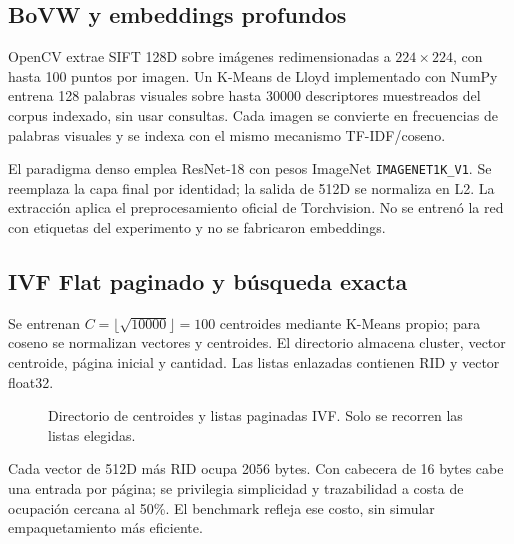 \documentclass[11pt,a4paper]{article}
\newcommand{\code}[1]{\texttt{#1}}
\begin{document}
\subsection{BoVW y embeddings profundos}
OpenCV extrae SIFT 128D sobre imágenes redimensionadas a $224\times224$, con hasta 100 puntos por imagen. Un K-Means de Lloyd implementado con NumPy entrena 128 palabras visuales sobre hasta 30000 descriptores muestreados del corpus indexado, sin usar consultas. Cada imagen se convierte en frecuencias de palabras visuales y se indexa con el mismo mecanismo TF-IDF/coseno.

El paradigma denso emplea ResNet-18 con pesos ImageNet \code{IMAGENET1K\_V1}. Se reemplaza la capa final por identidad; la salida de 512D se normaliza en L2. La extracción aplica el preprocesamiento oficial de Torchvision. No se entrenó la red con etiquetas del experimento y no se fabricaron embeddings.

\subsection{IVF Flat paginado y búsqueda exacta}
Se entrenan $C=\lfloor\sqrt{10000}\rfloor=100$ centroides mediante K-Means propio; para coseno se normalizan vectores y centroides. El directorio almacena cluster, vector centroide, página inicial y cantidad. Las listas enlazadas contienen RID y vector float32.

\begin{figure}[H]\centering
{}
\caption{Directorio de centroides y listas paginadas IVF. Solo se recorren las listas elegidas.}
\end{figure}

Cada vector de 512D más RID ocupa 2056 bytes. Con cabecera de 16 bytes cabe una entrada por página; se privilegia simplicidad y trazabilidad a costa de ocupación cercana al 50\%. El benchmark refleja ese costo, sin simular empaquetamiento más eficiente.
\end{document}
